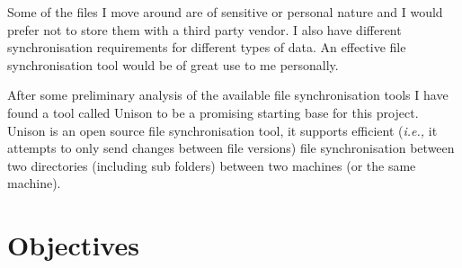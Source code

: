 \documentclass[12pt]{article}
\begin{document}
Some of the files I move around are of sensitive or personal nature
and I would prefer not to store them with a third party vendor.
I also have different synchronisation requirements for different
types of data. An effective file synchronisation tool would be of
great use to me personally.

After some preliminary analysis of the available file synchronisation
tools I have found a tool called Unison to be a promising starting
base for this project. Unison is an open source file synchronisation tool,
it supports efficient (\emph{i.e.,} it attempts to only send changes between file versions) file synchronisation between two
directories (including sub folders) between two machines (or the same
machine).
\section{Objectives}
\end{document}
